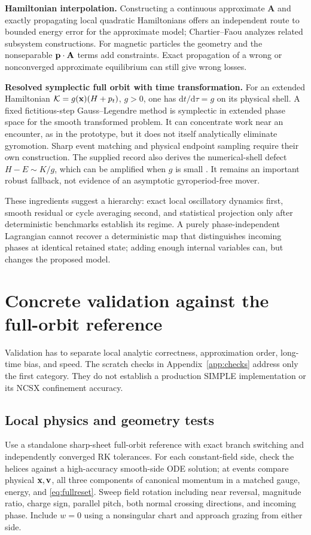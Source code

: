 \documentclass[10pt,a4paper]{article}
\newcommand{\A}{\mathbf A}\newcommand{\dd}{\mathrm d}
\begin{document}
\textbf{Hamiltonian interpolation.} Constructing a continuous approximate $\A$ and exactly propagating local quadratic Hamiltonians offers an independent route to bounded energy error for the approximate model; Chartier--Faou \cite{piecewise} analyzes related subsystem constructions. For magnetic particles the geometry and the nonseparable $\p\cdot\A$ terms add constraints. Exact propagation of a wrong or nonconverged approximate equilibrium can still give wrong losses.

\textbf{Resolved symplectic full orbit with time transformation.} For an extended Hamiltonian $\mathcal K=g(\mathbf x)(H+p_t)$, $g>0$, one has $\dd t/\dd\tau=g$ on its physical shell. A fixed fictitious-step Gauss--Legendre method is symplectic in extended phase space for the smooth transformed problem. It can concentrate work near an encounter, as in the prototype, but it does not itself analytically eliminate gyromotion. Sharp event matching and physical endpoint sampling require their own construction. The supplied record also derives the numerical-shell defect $H-E\sim K/g$, which can be amplified when $g$ is small \cite{rejected}. It remains an important robust fallback, not evidence of an asymptotic gyroperiod-free mover.

These ingredients suggest a hierarchy: exact local oscillatory dynamics first, smooth residual or cycle averaging second, and statistical projection only after deterministic benchmarks establish its regime. A purely phase-independent Lagrangian cannot recover a deterministic map that distinguishes incoming phases at identical retained state; adding enough internal variables can, but changes the proposed model.

\section{Concrete validation against the full-orbit reference}
\label{sec:validate}
Validation has to separate local analytic correctness, approximation order, long-time bias, and speed. The scratch checks in Appendix~\ref{app:checks} address only the first category. They do not establish a production SIMPLE implementation or its NCSX confinement accuracy.

\subsection{Local physics and geometry tests}
Use a standalone sharp-sheet full-orbit reference with exact branch switching and independently converged RK tolerances. For each constant-field side, check the helices against a high-accuracy smooth-side ODE solution; at events compare physical $\mathbf x,\mathbf v$, all three components of canonical momentum in a matched gauge, energy, and \eqref{eq:fullreset}. Sweep field rotation including near reversal, magnitude ratio, charge sign, parallel pitch, both normal crossing directions, and incoming phase. Include $w=0$ using a nonsingular chart and approach grazing from either side.
\end{document}
